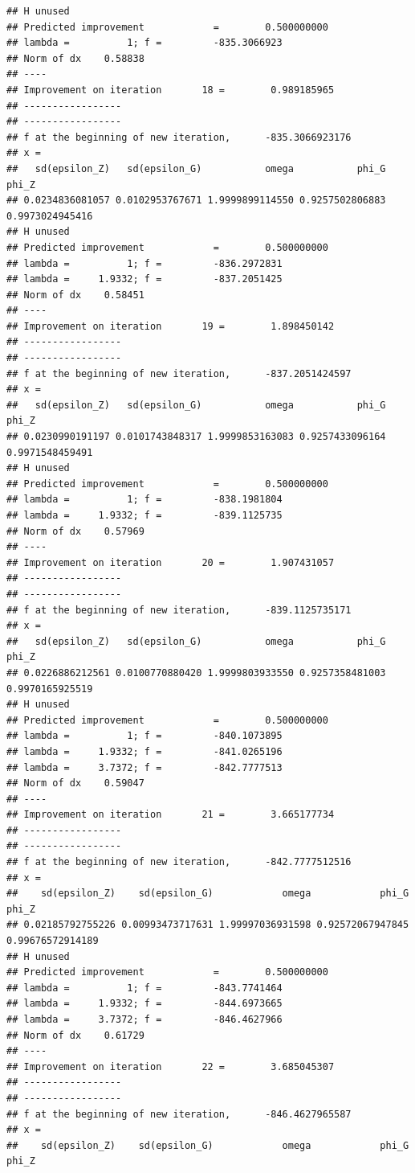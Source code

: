 \documentclass[12pt,a4paper,]{article}
\newcommand{\0}{\mathbf{0}}
\begin{document}
\begin{verbatim}
## H unused
## Predicted improvement            =        0.500000000
## lambda =          1; f =         -835.3066923 
## Norm of dx    0.58838
## ----
## Improvement on iteration       18 =        0.989185965
## -----------------
## -----------------
## f at the beginning of new iteration,      -835.3066923176 
## x =
##   sd(epsilon_Z)   sd(epsilon_G)           omega           phi_G           phi_Z 
## 0.0234836081057 0.0102953767671 1.9999899114550 0.9257502806883 0.9973024945416 
## H unused
## Predicted improvement            =        0.500000000
## lambda =          1; f =         -836.2972831 
## lambda =     1.9332; f =         -837.2051425 
## Norm of dx    0.58451
## ----
## Improvement on iteration       19 =        1.898450142
## -----------------
## -----------------
## f at the beginning of new iteration,      -837.2051424597 
## x =
##   sd(epsilon_Z)   sd(epsilon_G)           omega           phi_G           phi_Z 
## 0.0230990191197 0.0101743848317 1.9999853163083 0.9257433096164 0.9971548459491 
## H unused
## Predicted improvement            =        0.500000000
## lambda =          1; f =         -838.1981804 
## lambda =     1.9332; f =         -839.1125735 
## Norm of dx    0.57969
## ----
## Improvement on iteration       20 =        1.907431057
## -----------------
## -----------------
## f at the beginning of new iteration,      -839.1125735171 
## x =
##   sd(epsilon_Z)   sd(epsilon_G)           omega           phi_G           phi_Z 
## 0.0226886212561 0.0100770880420 1.9999803933550 0.9257358481003 0.9970165925519 
## H unused
## Predicted improvement            =        0.500000000
## lambda =          1; f =         -840.1073895 
## lambda =     1.9332; f =         -841.0265196 
## lambda =     3.7372; f =         -842.7777513 
## Norm of dx    0.59047
## ----
## Improvement on iteration       21 =        3.665177734
## -----------------
## -----------------
## f at the beginning of new iteration,      -842.7777512516 
## x =
##    sd(epsilon_Z)    sd(epsilon_G)            omega            phi_G            phi_Z 
## 0.02185792755226 0.00993473717631 1.99997036931598 0.92572067947845 0.99676572914189 
## H unused
## Predicted improvement            =        0.500000000
## lambda =          1; f =         -843.7741464 
## lambda =     1.9332; f =         -844.6973665 
## lambda =     3.7372; f =         -846.4627966 
## Norm of dx    0.61729
## ----
## Improvement on iteration       22 =        3.685045307
## -----------------
## -----------------
## f at the beginning of new iteration,      -846.4627965587 
## x =
##    sd(epsilon_Z)    sd(epsilon_G)            omega            phi_G            phi_Z 

\end{verbatim}
\end{document}
